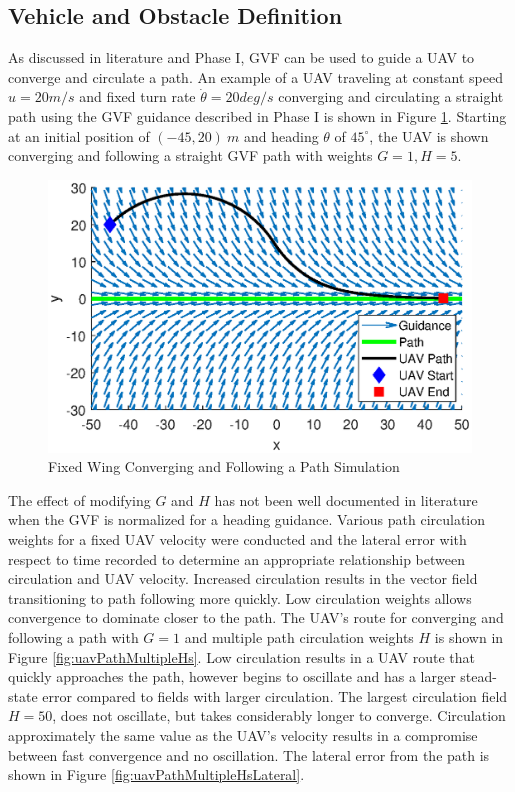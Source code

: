 \documentclass[numbered,pdftex]{ohio-etd}
\begin{document}
\subsection{Vehicle and Obstacle Definition}

As discussed in literature and Phase I, GVF can be used to guide a UAV to converge and circulate a path. An example of a UAV traveling at constant speed $u=20m/s$ and fixed turn rate $\dot{\theta}=20deg/s$ converging and circulating a straight path using the GVF guidance described in Phase I is shown in Figure \ref{fig:uavPathFollowDemo}. Starting at an initial position of $(-45,20) \ m$ and heading $\theta$ of $45^\circ$, the UAV is shown converging and following a straight GVF path with weights $G=1,H=5$.


\begin{figure}[H]
	\centering
	\includegraphics[trim=0 25 0 45,clip,width=14cm]{PaperFigures/Methods/uavPathFollowDemo}
	\caption{Fixed Wing Converging and Following a Path Simulation}
	\label{fig:uavPathFollowDemo}
\end{figure}

The effect of modifying $G$ and $H$ has not been well documented in literature when the GVF is normalized for a heading guidance. Various path circulation weights for a fixed UAV velocity were conducted and the lateral error with respect to time recorded to determine an appropriate relationship between circulation and UAV velocity. Increased circulation results in the vector field transitioning to path following more quickly. Low circulation weights allows convergence to dominate closer to the path. The UAV's route for converging and following a path with $G=1$ and multiple path circulation weights $H$ is shown in Figure \ref{fig:uavPathMultipleHs}. Low circulation results in a UAV route that quickly approaches the path, however begins to oscillate and has a larger stead-state error compared to fields with larger circulation. The largest circulation field $H=50$, does not oscillate, but takes considerably longer to converge. Circulation approximately the same value as the UAV's velocity results in a compromise between fast convergence and no oscillation. The lateral error from the path is shown in Figure \ref{fig:uavPathMultipleHsLateral}. 
\end{document}
